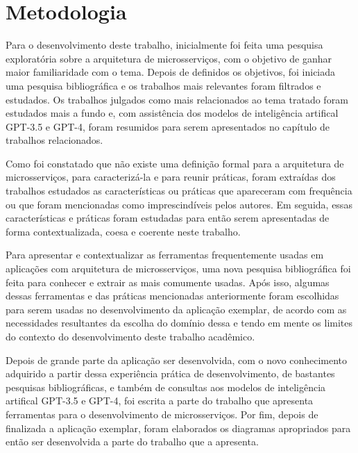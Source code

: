 \section{Metodologia}

Para o desenvolvimento deste trabalho, inicialmente foi feita uma pesquisa exploratória sobre a arquitetura de microsserviços, com o objetivo de ganhar maior familiaridade com o tema. Depois de definidos os objetivos, foi iniciada uma pesquisa bibliográfica e os trabalhos mais relevantes foram filtrados e estudados. Os trabalhos julgados como mais relacionados ao tema tratado foram estudados mais a fundo e, com assistência dos modelos de inteligência artifical GPT-3.5 e GPT-4, foram resumidos para serem apresentados no capítulo de trabalhos relacionados.

Como foi constatado que não existe uma definição formal para a arquitetura de microsserviços, para caracterizá-la e para reunir práticas, foram extraídas dos trabalhos estudados as características ou práticas que apareceram com frequência ou que foram mencionadas como imprescindíveis pelos autores. Em seguida, essas características e práticas foram estudadas para então serem apresentadas de forma contextualizada, coesa e coerente neste trabalho.




Para apresentar e contextualizar as ferramentas frequentemente usadas em aplicações com arquitetura de microsserviços, uma nova pesquisa bibliográfica foi feita para conhecer e extrair as mais comumente usadas. Após isso, algumas dessas ferramentas e das práticas mencionadas anteriormente foram escolhidas para serem usadas no desenvolvimento da aplicação exemplar, de acordo com as necessidades resultantes da escolha do domínio dessa e tendo em mente os limites do contexto do desenvolvimento deste trabalho acadêmico.

Depois de grande parte da aplicação ser desenvolvida, com o novo conhecimento adquirido a partir dessa experiência prática de desenvolvimento, de bastantes pesquisas bibliográficas, e também de consultas aos modelos de inteligência artifical GPT-3.5 e GPT-4, foi escrita a parte do trabalho que apresenta ferramentas para o desenvolvimento de microsserviços. Por fim, depois de finalizada a aplicação exemplar, foram elaborados os diagramas apropriados para então ser desenvolvida a parte do trabalho que a apresenta.

